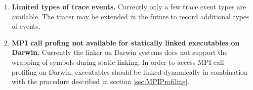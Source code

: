 %


\begin{enumerate}
\item{\bf Limited types of trace events.}
  Currently only a few trace event types are available. The tracer may
  be extended in the future to record additional types of events.
\item{\bf MPI call profing not available for statically linked executables on Darwin.}
  Currently the linker on Darwin systems does not support the wrapping of
  symbols during static linking. In order to access MPI call profiling on Darwin,
  executables should be linked dynamically in combination with the procedure
  described in section \ref{sec:MPIProfiling}.
\end{enumerate}



